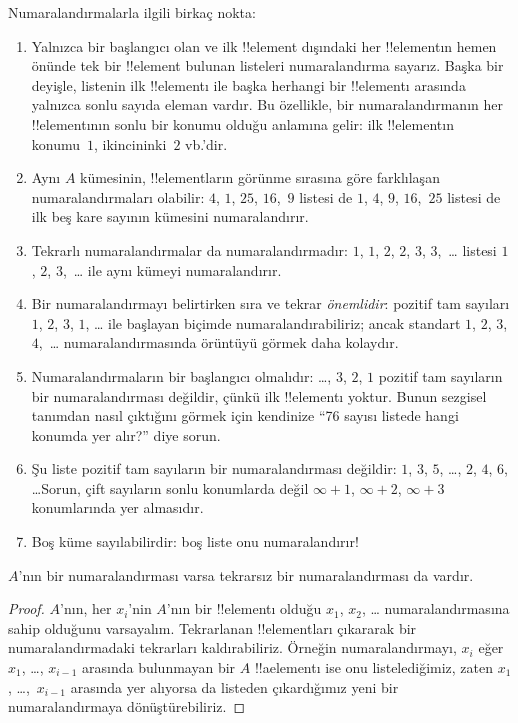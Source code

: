\documentclass[../../../include/open-logic-section]{subfiles}
\begin{document}
\begin{explain}
Numaralandırmalarla ilgili birkaç nokta:
\begin{enumerate}
\item Yalnızca bir başlangıcı olan ve ilk !!{element} dışındaki her
  !!{element}ın hemen önünde tek bir !!{element} bulunan listeleri
  numaralandırma sayarız. Başka bir deyişle, listenin ilk !!{element}ı ile
  başka herhangi bir !!{element}ı arasında yalnızca sonlu sayıda eleman
  vardır. Bu özellikle, bir numaralandırmanın her !!{element}ının sonlu bir
  konumu olduğu anlamına gelir: ilk !!{element}ın konumu~$1$, ikincininki~$2$
  vb.'dir.
\item Aynı $A$ kümesinin, !!{element}ların görünme sırasına göre farklılaşan
  numaralandırmaları olabilir: $4$, $1$, $25$, $16$,~$9$ listesi de $1$,
  $4$, $9$, $16$,~$25$ listesi de ilk beş kare sayının kümesini numaralandırır.
\item Tekrarlı numaralandırmalar da numaralandırmadır: $1$, $1$, $2$, $2$,
  $3$, $3$,~\dots{} listesi $1$, $2$, $3$,~\dots{} ile aynı kümeyi
  numaralandırır.
\item Bir numaralandırmayı belirtirken sıra ve tekrar \emph{önemlidir}:
  pozitif tam sayıları $1$, $2$, $3$, $1$, \dots{} ile başlayan biçimde
  numaralandırabiliriz; ancak standart $1$, $2$, $3$, $4$,~\dots{}
  numaralandırmasında örüntüyü görmek daha kolaydır.
\item Numaralandırmaların bir başlangıcı olmalıdır: \dots, $3$, $2$, $1$
  pozitif tam sayıların bir numaralandırması değildir, çünkü ilk
  !!{element}ı yoktur. Bunun sezgisel tanımdan nasıl çıktığını görmek için
  kendinize ``76 sayısı listede hangi konumda yer alır?'' diye sorun.
\item Şu liste pozitif tam sayıların bir numaralandırması değildir: $1$, $3$,
  $5$, \dots, $2$, $4$, $6$, \dots\@ Sorun, çift sayıların sonlu konumlarda
  değil $\infty + 1$, $\infty + 2$, $\infty + 3$ konumlarında yer almasıdır.
\item Boş küme sayılabilirdir: boş liste onu numaralandırır!{}
\end{enumerate}
\end{explain}

\begin{prop}
  $A$'nın bir numaralandırması varsa tekrarsız bir numaralandırması da vardır.
\end{prop}

\begin{proof}
  $A$'nın, her $x_i$'nin $A$'nın bir !!{element}ı olduğu $x_1$, $x_2$,
  \dots{} numaralandırmasına sahip olduğunu varsayalım. Tekrarlanan
  !!{element}ları çıkararak bir numaralandırmadaki tekrarları kaldırabiliriz.
  Örneğin numaralandırmayı, $x_i$ eğer $x_1$, \dots, $x_{i-1}$ arasında
  bulunmayan bir $A$ !!a{element}ı ise onu listelediğimiz, zaten $x_1$,
  \dots,~$x_{i-1}$ arasında yer alıyorsa da listeden çıkardığımız yeni bir
  numaralandırmaya dönüştürebiliriz.
\end{proof}
\end{document}
